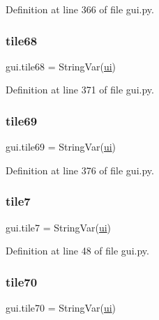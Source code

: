 Definition at line 366 of file gui.\+py.

\mbox{\label{namespacegui_a04d5995a5f47514361d4d9b85b41fdd4}} 
\subsubsection{\texorpdfstring{tile68}{tile68}}
{\footnotesize\ttfamily gui.\+tile68 = String\+Var(\mbox{\hyperlink{namespacegui_a40ab7281456eadbea2dc2038f5c24fa1}{ui}})}



Definition at line 371 of file gui.\+py.

\mbox{\label{namespacegui_a6246ec72785ce9baef112ad048f0ea64}} 
\subsubsection{\texorpdfstring{tile69}{tile69}}
{\footnotesize\ttfamily gui.\+tile69 = String\+Var(\mbox{\hyperlink{namespacegui_a40ab7281456eadbea2dc2038f5c24fa1}{ui}})}



Definition at line 376 of file gui.\+py.

\mbox{\label{namespacegui_a70acffcd35aab2bfac1aa2340f9dab4c}} 
\subsubsection{\texorpdfstring{tile7}{tile7}}
{\footnotesize\ttfamily gui.\+tile7 = String\+Var(\mbox{\hyperlink{namespacegui_a40ab7281456eadbea2dc2038f5c24fa1}{ui}})}



Definition at line 48 of file gui.\+py.

\mbox{\label{namespacegui_a7e7a0ebb979b6a2f52ea9bf6a87066b1}} 
\subsubsection{\texorpdfstring{tile70}{tile70}}
{\footnotesize\ttfamily gui.\+tile70 = String\+Var(\mbox{\hyperlink{namespacegui_a40ab7281456eadbea2dc2038f5c24fa1}{ui}})}



